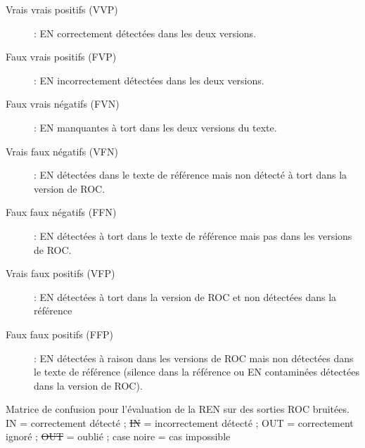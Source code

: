 \begin{description}
  \item[Vrais vrais positifs (VVP)]: EN correctement détectées dans les deux versions.
  \item[Faux vrais positifs (FVP)]:  EN incorrectement détectées dans les deux versions.
  \item[Faux vrais négatifs (FVN)] :  EN manquantes à tort dans les deux versions du texte.
  \item[Vrais faux négatifs (VFN)]:  EN détectées dans le texte de référence mais non détecté à tort dans la version de ROC.
  \item[Faux faux négatifs (FFN)]: EN  détectées à tort dans le texte de référence mais pas dans les versions de ROC.
  

  \item[Vrais faux positifs (VFP)]: EN détectées  à tort dans la version de ROC et non détectées dans la référence

    \item[Faux faux positifs (FFP)]: EN détectées à raison dans les versions de ROC mais non détectées dans le texte de référence (silence dans la référence ou EN contaminées détectées dans la version de ROC).

    
\end{description}

\begin{table}[h!]
    \centering
    

    \caption{Matrice de confusion pour l'évaluation de la REN sur des sorties ROC bruitées. IN = correctement détecté ; \sout{IN} = incorrectement détecté ; OUT = correctement ignoré ; \sout{OUT} = oublié ; case noire = cas impossible}
    \label{tab:Matrice_erreur_OCR_V2}
\end{table}






